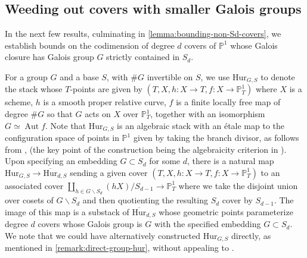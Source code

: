 \documentclass[12 pt]{amsart}
\newcommand{\rboxed}[1]{#1}
\theoremstyle{plain}
\theoremstyle{definition}
\theoremstyle{remark}
\numberwithin{equation}{section}
\newcommand\bp{\mathbb P}
\newcommand\bighur[2]{\overline{\mathrm{Hur}}_{#1,#2}} %
\newcommand\grouphur[2]{\mathrm{Hur}_{#1,#2}} %
\DeclareMathOperator\aut{Aut}
\begin{document}
\subsection{Weeding out covers with smaller Galois groups}
\label{subsection:bounding-smaller-galois-group}

In the next few results, culminating in 
\autoref{lemma:bounding-non-Sd-covers},
we establish bounds on the codimension of degree $d$
covers of $\bp^1$ whose
Galois closure has Galois group $G$ strictly contained in $S_d$.

For a group $G$ and a base $S$, with $\# G$ invertible on $S$, we use
$\rboxed{\grouphur G S}$ to denote the stack whose $T$-points are given by $(T,
X, h: X \to T, f: X \to \bp^1_T)$ where $X$ is a scheme, $h$ is a smooth proper
relative curve, $f$ is a finite locally
free map of degree $\# G$ so that $G$ acts on $X$ over $\bp^1_T$, together with
an isomorphism $G \simeq \aut f$.  Note that $\grouphur G S$ is an algebraic
stack with an \'etale map to the configuration space of points in $\bp^1$ given
by taking the branch divisor, as follows from \cite[Thm.\  4]{wewers:thesis},
(the key point of the construction being the algebraicity criterion in
\cite[Thm.\  1.3.3]{wewers:thesis}).  Upon specifying an embedding $G \subset
S_d$ for some $d$, there is a natural map $\grouphur G S \to \bighur d S$
sending a given cover $(T, X, h: X \to T, f: X \to \bp^1_T)$ to an associated
cover $\coprod_{h \in G \backslash S_d} (h X)/S_{d-1} \to \bp^1_T$ where we take
the disjoint union over cosets of $G \backslash S_d$ and then quotienting the
resulting $S_d$ cover by $S_{d-1}$. 
The image of this map is a substack of $\bighur d S$ whose geometric points
parameterize degree $d$ covers whose Galois group is $G$ with the specified
embedding $G \subset S_d$.
We note that we could have alternatively constructed $\grouphur G S$ directly,
as mentioned in \autoref{remark:direct-group-hur}, without appealing to
\cite{wewers:thesis}.
\end{document}
